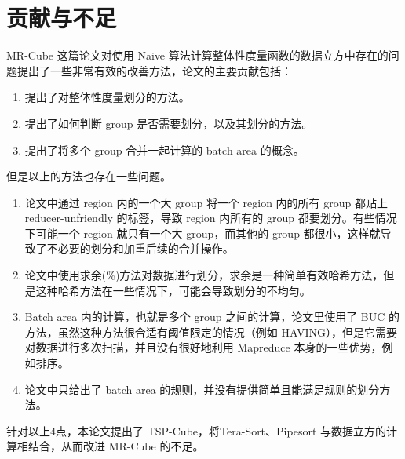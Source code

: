 \section{贡献与不足}

MR-Cube \cite{nandi2011distributed} 这篇论文对使用 Naive 算法计算整体性度量函数的数据立方中存在的问题提出了一些非常有效的改善方法，论文的主要贡献包括：

\begin{enumerate}
\item 提出了对整体性度量划分的方法。
\item 提出了如何判断 group 是否需要划分，以及其划分的方法。
\item 提出了将多个 group 合并一起计算的 batch area 的概念。
\end{enumerate}

但是以上的方法也存在一些问题。

\begin{enumerate}
\item 论文中通过 region 内的一个大 group 将一个 region 内的所有 group 都贴上 reducer-unfriendly 的标签，导致 region 内所有的 group 都要划分。有些情况下可能一个 region 就只有一个大 group，而其他的 group 都很小，这样就导致了不必要的划分和加重后续的合并操作。
\item 论文中使用求余(\%)方法对数据进行划分，求余是一种简单有效哈希方法，但是这种哈希方法在一些情况下，可能会导致划分的不均匀。
\item Batch area 内的计算，也就是多个 group 之间的计算，论文里使用了 BUC 的方法，虽然这种方法很合适有阈值限定的情况（例如 HAVING），但是它需要对数据进行多次扫描，并且没有很好地利用 Mapreduce 本身的一些优势，例如排序。
\item 论文中只给出了 batch area 的规则，并没有提供简单且能满足规则的划分方法。
\end{enumerate}

针对以上4点，本论文提出了 TSP-Cube，将Tera-Sort、Pipesort 与数据立方的计算相结合，从而改进 MR-Cube 的不足。





